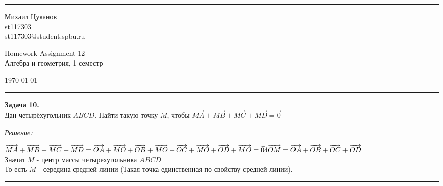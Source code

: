 \documentclass[a4paper, 12pt]{article}
\newenvironment{problem}[2][Задача]
    { \begin{mdframed}[backgroundcolor=gray!10] \textbf{#1 #2.} \\}
    {  \end{mdframed}}
\newenvironment{solution}
    {\textit{Решение: }}
    {\noindent\rule{7in}{1.5pt}}
\begin{document}

\fancyhead[C]{}
\hrule \medskip %
\begin{minipage}{0.295\textwidth}
\raggedright\footnotesize
Михаил Цуканов \hfill\\
st117303 \hfill\\
st117303@student.spbu.ru
\end{minipage}
\begin{minipage}{0.4\textwidth}
\centering\large
Homework Assignment 12\\
\normalsize
Алгебра и геометрия, 1 семестр\\
\end{minipage}
\begin{minipage}{0.295\textwidth}
\raggedleft
\today\hfill\\
\end{minipage}
\medskip\hrule
\bigskip




\begin{problem}{10}
Дан четырёхугольник $ABCD$. Найти такую точку $M$, чтобы
$
\overrightarrow{MA} + \overrightarrow{MB} + \overrightarrow{MC} + \overrightarrow{MD} = \vec{0}
$
\end{problem}
\begin{solution}

$
\overrightarrow{MA} + \overrightarrow{MB} + \overrightarrow{MC} + \overrightarrow{MD} =
\overrightarrow{OA} + \overrightarrow{MO} +
\overrightarrow{OB} + \overrightarrow{MO} +
\overrightarrow{OC} + \overrightarrow{MO} +
\overrightarrow{OD} + \overrightarrow{MO} = \vec{0}
\\
4\overrightarrow{OM} =
 \overrightarrow{OA} +
 \overrightarrow{OB} +
 \overrightarrow{OC} +
 \overrightarrow{OD}
$
\\
Значит $M$ - центр массы четырехугольника $ABCD$ \\
То есть $M$ - середина средней линии (Такая точка единственная по свойству средней линии).

\end{solution}
\end{document}
